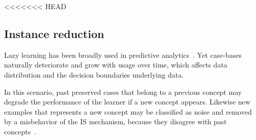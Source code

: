 \documentclass[preprint,12pt]{elsarticle}
\begin{document}

<<<<<<< HEAD

\subsection{Instance reduction}
\label{subsec:isel}

Lazy learning has been broadly used in predictive analytics~\cite{cover67}. Yet case-bases naturally deteriorate and grow with usage over time, which affects data distribution and the decision boundaries underlying data.

In this scenario, past preserved cases that belong to a previous concept may degrade the performance of the learner if a new concept appears. Likewise new examples that represents a new concept may be classified as noise and removed by a misbehavior of the IS mechanism, because they disagree with past concepts~\cite{lu16}. 
\end{document}
